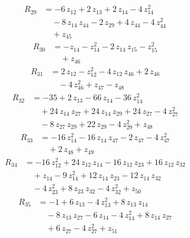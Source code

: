 \begin{equation*}\begin{aligned}
R_{29}&=-6\,z_{12} +2\,z_{13} +2\,z_{14} -4\,z_{14}^{2} \\
&\quad -8\,z_{14}\,z_{44} -2\,z_{29} +4\,z_{44} -4\,z_{44}^{2} \\
&\quad +z_{45}
\end{aligned}\end{equation*}
\begin{equation*}\begin{aligned}
R_{30}&=-z_{14} -z_{14}^{2} -2\,z_{14}\,z_{15} -z_{15}^{2} \\
&\quad +z_{46}
\end{aligned}\end{equation*}
\begin{equation*}\begin{aligned}
R_{31}&=2\,z_{12} -z_{12}^{2} -4\,z_{12}\,z_{46} +2\,z_{46} \\
&\quad -4\,z_{46}^{2} +z_{47} -z_{48}
\end{aligned}\end{equation*}
\begin{equation*}\begin{aligned}
R_{32}&=-35 +2\,z_{13} -66\,z_{14} -36\,z_{14}^{2} \\
&\quad +24\,z_{14}\,z_{27} +24\,z_{14}\,z_{29} +24\,z_{27} -4\,z_{27}^{2} \\
&\quad -8\,z_{27}\,z_{29} +22\,z_{29} -4\,z_{29}^{2} +z_{48}
\end{aligned}\end{equation*}
\begin{equation*}\begin{aligned}
R_{33}&=-16\,z_{14}^{2} -16\,z_{14}\,z_{47} -2\,z_{47} -4\,z_{47}^{2} \\
&\quad +2\,z_{48} +z_{49}
\end{aligned}\end{equation*}
\begin{equation*}\begin{aligned}
R_{34}&=-16\,z_{12}^{2} +24\,z_{12}\,z_{14} -16\,z_{12}\,z_{23} +16\,z_{12}\,z_{32} \\
&\quad +z_{14} -9\,z_{14}^{2} +12\,z_{14}\,z_{23} -12\,z_{14}\,z_{32} \\
&\quad -4\,z_{23}^{2} +8\,z_{23}\,z_{32} -4\,z_{32}^{2} +z_{50}
\end{aligned}\end{equation*}
\begin{equation*}\begin{aligned}
R_{35}&=-1 +6\,z_{13} -4\,z_{13}^{2} +8\,z_{13}\,z_{14} \\
&\quad -8\,z_{13}\,z_{27} -6\,z_{14} -4\,z_{14}^{2} +8\,z_{14}\,z_{27} \\
&\quad +6\,z_{27} -4\,z_{27}^{2} +z_{51}
\end{aligned}\end{equation*}

